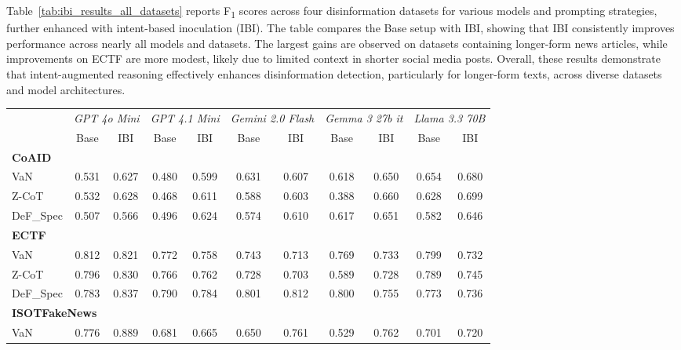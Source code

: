 \documentclass[11pt]{article}
\begin{document}
Table~\ref{tab:ibi_results_all_datasets} reports F\textsubscript{1} scores across four disinformation datasets for various models and prompting strategies, further enhanced with intent-based inoculation (IBI). The table compares the Base setup with IBI, showing that IBI consistently improves performance across nearly all models and datasets. The largest gains are observed on datasets containing longer-form news articles, while improvements on ECTF are more modest, likely due to limited context in shorter social media posts. Overall, these results demonstrate that intent-augmented reasoning effectively enhances disinformation detection, particularly for longer-form texts, across diverse datasets and model architectures.


\begin{table}[!ht]
\footnotesize
\centering
\begin{tabular}{lcccccccccc}
\toprule
 & \multicolumn{2}{c}{\textit{GPT 4o Mini}} 
 & \multicolumn{2}{c}{\textit{GPT 4.1 Mini}} 
 & \multicolumn{2}{c}{\textit{Gemini 2.0 Flash}} 
 & \multicolumn{2}{c}{\textit{Gemma 3 27b it}} 
 & \multicolumn{2}{c}{\textit{Llama 3.3 70B}} \\
\cmidrule(lr){2-3} \cmidrule(lr){4-5} \cmidrule(lr){6-7} \cmidrule(lr){8-9} \cmidrule(lr){10-11}
 & Base & IBI & Base & IBI & Base & IBI & Base & IBI & Base & IBI \\
\midrule
\multicolumn{11}{l}{\textbf{CoAID}} \\
VaN       & 0.531 & 0.627 & 0.480 & 0.599 & 0.631 & 0.607 & 0.618 & 0.650 & 0.654 & 0.680 \\
Z-CoT     & 0.532 & 0.628 & 0.468 & 0.611 & 0.588 & 0.603 & 0.388 & 0.660 & 0.628 & 0.699 \\
DeF\_Spec & 0.507 & 0.566 & 0.496 & 0.624 & 0.574 & 0.610 & 0.617 & 0.651 & 0.582 & 0.646 \\
\midrule
\multicolumn{11}{l}{\textbf{ECTF}} \\
VaN       & 0.812 & 0.821 & 0.772 & 0.758 & 0.743 & 0.713 & 0.769 & 0.733 & 0.799 & 0.732 \\
Z-CoT     & 0.796 & 0.830 & 0.766 & 0.762 & 0.728 & 0.703 & 0.589 & 0.728 & 0.789 & 0.745 \\
DeF\_Spec & 0.783 & 0.837 & 0.790 & 0.784 & 0.801 & 0.812 & 0.800 & 0.755 & 0.773 & 0.736 \\
\midrule
\multicolumn{11}{l}{\textbf{ISOTFakeNews}} \\
VaN       & 0.776 & 0.889 & 0.681 & 0.665 & 0.650 & 0.761 & 0.529 & 0.762 & 0.701 & 0.720 \\

\end{tabular}
\end{table}
\end{document}

